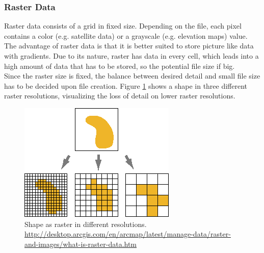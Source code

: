 \subsubsection{Raster Data}
 Raster data consists of a grid in fixed size. Depending on the file, each pixel contains a color (e.g. satellite data)  or a grayscale (e.g. elevation maps) value. \\
 The advantage of raster data is that it is better suited to store picture like data with gradients. Due to its nature, raster has data in every cell, which leads into a high amount of data that has to be stored, so the potential file size if big.\\
 Since the raster size is fixed, the balance between desired detail and small file size has to be decided upon file creation. Figure \ref{img:raster} shows a shape in three different raster resolutions, visualizing the loss of detail on lower raster resolutions.
 \begin{figure}[H]
 	\centering\includegraphics[width=.5\textwidth]{res/Vector-Raster}
 	\caption{Shape as raster in different resolutions. \url{http://desktop.arcgis.com/en/arcmap/latest/manage-data/raster-and-images/what-is-raster-data.htm}}
 	\label{img:raster}
 \end{figure}

